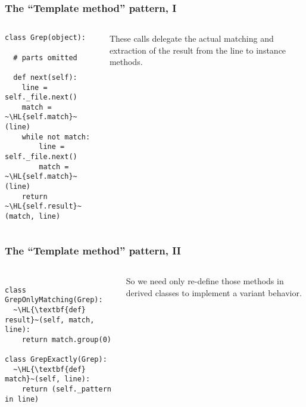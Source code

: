 \documentclass[english,serif,mathserif,xcolor=pdftex,dvipsnames,table]{beamer}
\begin{document}
\begin{frame}[fragile]
  \frametitle{The ``Template method'' pattern, I}
  \begin{columns}[t]
    \begin{column}{0.5\textwidth}
\begin{lstlisting}
class Grep(object):

  # parts omitted

  def next(self):
    line = self._file.next()
    match = ~\HL{self.match}~(line)
    while not match:
        line = self._file.next()
        match = ~\HL{self.match}~(line)
    return ~\HL{self.result}~(match, line)
\end{lstlisting}
    \end{column}
    \begin{column}{0.5\textwidth}
      \raggedleft
      These calls delegate the actual matching and
      extraction of the result from the line to instance methods.
    \end{column}
  \end{columns}
\end{frame}


\begin{frame}[fragile]
  \frametitle{The ``Template method'' pattern, II}
  \begin{columns}[t]
    \begin{column}{0.5\textwidth}
\begin{lstlisting}

class GrepOnlyMatching(Grep):
  ~\HL{\textbf{def} result}~(self, match, line):
    return match.group(0)

class GrepExactly(Grep):
  ~\HL{\textbf{def} match}~(self, line):
    return (self._pattern in line)
\end{lstlisting}
    \end{column}
    \begin{column}{0.5\textwidth}
      \raggedleft
      So we need only re-define those methods in derived
      classes to implement a variant behavior.
    \end{column}
  \end{columns}
\end{frame}
\end{document}
